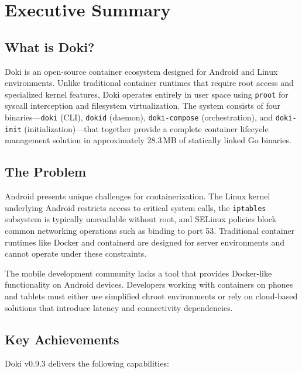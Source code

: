 \chapter{Executive Summary}
\label{ch:summary}

\section{What is Doki?}
\label{sec:what-is-doki}

Doki is an open-source container ecosystem designed for Android and
Linux environments. Unlike traditional container runtimes that require
root access and specialized kernel features, Doki operates entirely in
user space using \texttt{proot} for syscall interception and filesystem
virtualization. The system consists of four binaries---\texttt{doki}
(CLI), \texttt{dokid} (daemon), \texttt{doki-compose} (orchestration),
and \texttt{doki-init} (initialization)---that together provide a
complete container lifecycle management solution in approximately
28.3\,MB of statically linked Go binaries.

\section{The Problem}
\label{sec:problem}

Android presents unique challenges for containerization. The Linux
kernel underlying Android restricts access to critical system calls,
the \texttt{iptables} subsystem is typically unavailable without root,
and SELinux policies block common networking operations such as binding
to port 53. Traditional container runtimes like Docker and containerd
are designed for server environments and cannot operate under these
constraints.

The mobile development community lacks a tool that provides Docker-like
functionality on Android devices. Developers working with containers
on phones and tablets must either use simplified chroot environments
or rely on cloud-based solutions that introduce latency and connectivity
dependencies.

\section{Key Achievements}
\label{sec:achievements}

Doki v0.9.3 delivers the following capabilities:

